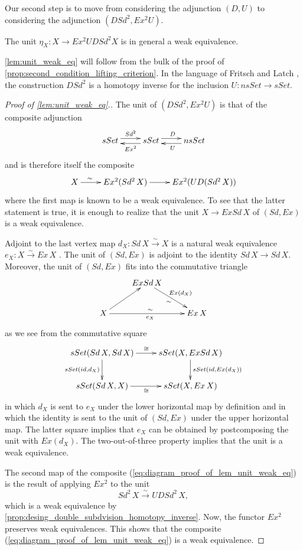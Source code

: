 Our second step is to move from considering the adjunction $(D,U)$ to considering the adjunction $(DSd^2,Ex^2U)$.
\begin{lemma}\label{lem:unit_weak_eq}
The unit $\eta _X:X\to Ex^2UDSd^2X$ is in general a weak equivalence.
\end{lemma}
\noindent \cref{lem:unit_weak_eq} will follow from the bulk of the proof of \cref{prop:second_condition_lifting_criterion}. In the language of Fritsch and Latch \cite{FL81}, the construction $DSd^2$ is a homotopy inverse for the inclusion $U:nsSet\to sSet$.
\begin{proof}[Proof of \cref{lem:unit_weak_eq}.]
The unit of $(DSd^2,Ex^2U)$ is that of the composite adjunction
\begin{displaymath}
 \xymatrix{
 sSet \ar@<+.7ex>[r]^{Sd^2} & sSet \ar@<+.7ex>[l]^{Ex^2} \ar@<+.7ex>[r]^D & nsSet \ar@<+.7ex>[l]^U
 }
\end{displaymath}
and is therefore itself the composite
\begin{equation}
\label{eq:diagram_proof_of_lem_unit_weak_eq}
\begin{gathered}
\xymatrix{
X \ar[r]^(.3)\sim & Ex^2(Sd^2\, X) \ar[r] & Ex^2(UD(Sd^2\, X))
}
\end{gathered}
\end{equation}
where the first map is known to be a weak equivalence. To see that the latter statement is true, it is enough to realize that the unit $X\to ExSd\, X$ of $(Sd,Ex)$ is a weak equivalence.

Adjoint \cite[p.~213]{FP90} to the last vertex map $d_X:Sd\, X\xrightarrow{\sim } X$ is a natural weak equivalence $e_X:X\xrightarrow{\sim } Ex\, X$ \cite[Lem.~4.6.20]{FP90}. The unit of $(Sd,Ex)$ is adjoint to the identity $Sd\, X\to Sd\, X$. Moreover, the unit of $(Sd,Ex)$ fits into the commutative triangle
\begin{displaymath}
\xymatrix{
& ExSd\, X \ar[dr]^{Ex(d_X)}_\sim \\
X \ar[ur] \ar[rr]_{e_X}^\sim && Ex\, X
}
\end{displaymath}
as we see from the commutative square
\begin{displaymath}
\xymatrix{
sSet(Sd\, X,Sd\, X) \ar[d]_{sSet(id,d_X)} \ar[r]^\cong & sSet(X,ExSd\, X) \ar[d]^{sSet(id,Ex(d_X))} \\
sSet(Sd\, X,X) \ar[r]_\cong & sSet(X,Ex\, X)
}
\end{displaymath}
in which $d_X$ is sent to $e_X$ under the lower horizontal map by definition and in which the identity is sent to the unit of $(Sd,Ex)$ under the upper horizontal map. The latter square implies that $e_X$ can be obtained by postcomposing the unit with $Ex(d_X)$. The two-out-of-three property implies that the unit is a weak equivalence.

The second map of the composite (\ref{eq:diagram_proof_of_lem_unit_weak_eq}) is the result of applying $Ex^2$ to the unit
\[Sd^2\, X\xrightarrow{\sim } UDSd^2\, X,\]
which is a weak equivalence by \cref{prop:desing_double_subdvision_homotopy_inverse}. Now, the functor $Ex^2$ preserves weak equivalences. This shows that the composite (\ref{eq:diagram_proof_of_lem_unit_weak_eq}) is a weak equivalence.
\end{proof}
